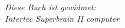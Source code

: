 \begin{titlepage}
\vspace*{\fill}

\begin{flushright}
\emph{Diese Buch ist gewidmet: \\
Intertec Superbrain II computer}

\end{flushright}

\vspace*{\fill}
\end{titlepage}

